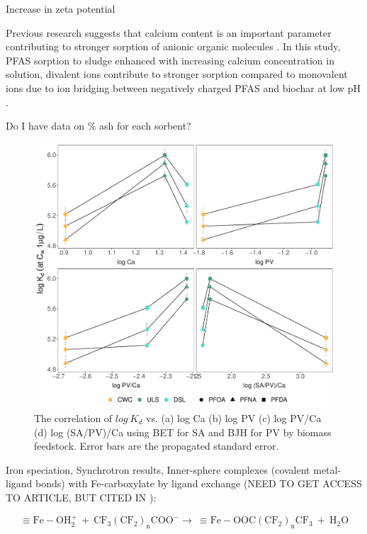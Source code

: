 Increase in zeta potential 

Previous research suggests that calcium content is an important parameter contributing to stronger sorption of anionic organic molecules \citep{higgins2006sorption,sigmund2022sorption}. In this study, PFAS sorption to sludge enhanced with increasing calcium concentration in solution, divalent ions contribute to stronger sorption compared to monovalent ions due to ion bridging between negatively charged PFAS and biochar at low pH \citep{zhang2013sorption,arvaniti2014sorption,arvaniti2015review}. 

Do I have data on \% ash for each sorbent?
\begin{figure}[htb]
    \centering
    \includegraphics[width=\textwidth]{R/figs/Correlation_SAPV_Ca_plot.pdf}
    \caption{The correlation of $log~K_d$ vs. (a) log Ca (b) log PV (c) log PV/Ca (d) log (SA/PV)/Ca using BET for SA and BJH for PV by biomass feedstock. Error bars are the propagated standard error.}
    \label{fig:Kd_SAPV_Ca}
\end{figure}


Iron speciation, Synchrotron results, Inner-sphere complexes (covalent metal-ligand bonds) with Fe-carboxylate by ligand exchange \citep{gao2012adsorption}(NEED TO GET ACCESS TO ARTICLE, BUT CITED IN \citep{du2014adsorption}):

\begin{equation}
    \mathrm{\equiv Fe-OH_2^+~ + ~ CF_3(CF_2)_nCOO^- \rightarrow   ~ \equiv Fe-OOC(CF_2)_nCF_3 ~+~ H_2O}
\end{equation}




